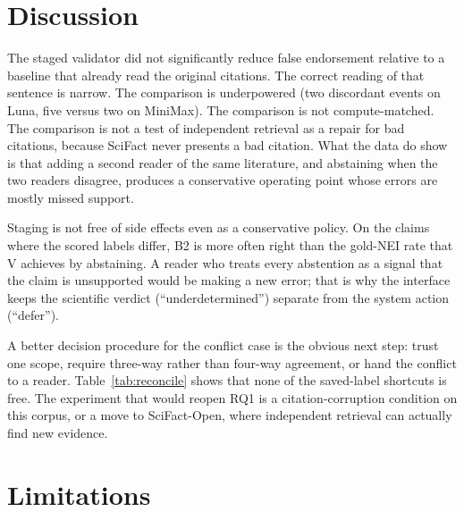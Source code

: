 \documentclass[11pt,a4paper]{article}
\begin{document}
\begin{table}[t]
\centering
\caption{Sensitivity to the fail-closed accounting and to the second
development run. ``Scored only'' excludes execution failures; ``all
rows'' scores every submitted claim with the label the method recorded.}
\label{tab:sensitivity}

\end{table}

\section{Discussion}

The staged validator did not significantly reduce false endorsement
relative to a baseline that already read the original citations. The
correct reading of that sentence is narrow. The comparison is
underpowered (two discordant events on Luna, five versus two on
MiniMax). The comparison is not compute-matched. The comparison is not
a test of independent retrieval as a repair for bad citations, because
SciFact never presents a bad citation. What the data do show is that
adding a second reader of the same literature, and abstaining when the
two readers disagree, produces a conservative operating point whose
errors are mostly missed support.

Staging is not free of side effects even as a conservative policy. On
the claims where the scored labels differ, B2 is more often right than
the gold-NEI rate that V achieves by abstaining. A reader who treats
every abstention as a signal that the claim is unsupported would be
making a new error; that is why the interface keeps the scientific
verdict (``underdetermined'') separate from the system action (``defer'').

A better decision procedure for the conflict case is the obvious next
step: trust one scope, require three-way rather than four-way
agreement, or hand the conflict to a reader. Table~\ref{tab:reconcile}
shows that none of the saved-label shortcuts is free. The experiment
that would reopen RQ1 is a citation-corruption condition on this
corpus, or a move to SciFact-Open, where independent retrieval can
actually find new evidence.

\section{Limitations}
\end{document}
